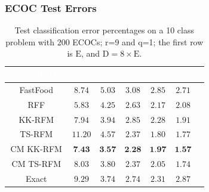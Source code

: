 \documentclass[xcolor=x11names,compress,ignorenonframetext,10pt]{beamer}
\renewcommand{\(}{\begin{columns}}
\renewcommand{\)}{\end{columns}}
\newcommand{\<}[1]{\begin{column}{#1}}
\renewcommand{\>}{\end{column}}
\begin{document}
\begin{frame}
\frametitle{ECOC Test Errors}
\begin{table}[!t]
\begin{center}
\small{
\begin{tabular}{| c|| c| c| c| c| c| c|}
    \hline
    \rowcolor{gray!170}
    $\textrm{\textcolor{white}{e-PENDIGITS}}$ & $\textcolor{white}{2^6}$ & $\textcolor{white}{2^7}$ & $\textcolor{white}{2^8}$ & $\textcolor{white}{2^{9}}$ & $\textcolor{white}{2^{10}}$\\
    \hline
    \hline
    FastFood & $8.74$ & $5.03$ & $3.08$ & $2.85$ & $2.71$\\\hline
    RFF & $5.83$ & $4.25$ & $2.63$ & $2.17$ & $2.08$\\\hline
    KK-RFM & $7.94$ & $3.94$ & $2.85$ & $2.28$ & $1.91$\\\hline
    TS-RFM & $11.20$ & $4.57$ & $2.37$ & $1.80$ & $1.77$\\\hline
    CM KK-RFM & $\textbf{7.43}$ & $\textbf{3.57}$ & $\textbf{2.28}$ & $\textbf{1.97}$ & $\textbf{1.57}$\\\hline
    CM TS-RFM & $8.03$ & $3.80$ & $2.37$ & $2.05$ & $1.74$\\\hline
    Exact & $9.29$ & $3.74$ & $2.74$ & $2.31$ & $2.87$\\
    \hline
  \end{tabular}
}
\caption*{\small{Test classification error percentages on a 10 class problem with 200 ECOCs; r=9 and q=1; the first row is $\mathrm{E}$, and $\mathrm{D}=8 \times \mathrm{E}$.}}
\end{center}
\end{table}
\end{frame}
\end{document}
